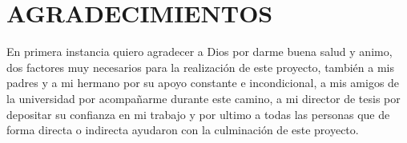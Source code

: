 \section{AGRADECIMIENTOS}

En primera instancia quiero agradecer a Dios por darme buena salud y animo, dos factores muy necesarios para la realización de este proyecto, también a mis padres y a mi hermano por su apoyo constante e incondicional, a mis amigos de la universidad por acompañarme durante este camino, a mi director de tesis por depositar su confianza en mi trabajo y por ultimo a todas las personas que de forma directa o indirecta ayudaron con la culminación de este proyecto.
